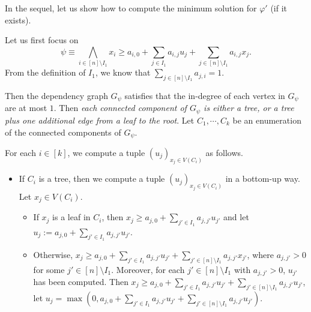 \documentclass[runningheads]{llncs}
\begin{document}
{In the sequel, let us show how to compute the minimum solution for $\varphi'$ (if it exists).

Let us first focus on 
\[
\psi  \equiv \bigwedge \limits_{i \in [n] \setminus I_1} x_i \ge a_{i,0} + \sum \limits_{j \in I_1} a_{i, j} u_j + \sum \limits_{j \in [n] \setminus I_1} a_{i, j} x_j.
\]
From the definition of $I_1$, we know that $\sum \limits_{j \in [n] \setminus I_1} a_{j, i} = 1$.  

Then the dependency graph $G_\psi$ satisfies that the in-degree of each vertex in $G_\psi$ are at most $1$. Then \emph{each connected component of $G_\psi$ is either a tree, or a tree plus one additional edge from a leaf to the root}. Let $C_1, \cdots, C_k$ be an enumeration of the connected components of $G_\psi$. 

For each $i \in [k]$, we compute a tuple $(u_j)_{x_j \in V(C_i)}$ as follows.  

\begin{itemize}
\item If $C_i$ is a tree, then we compute a tuple $(u_j)_{x_j \in V(C_i)}$ in a bottom-up way. Let $x_j \in V(C_i)$.  
\begin{itemize}
\item If $x_j$ is a leaf in $C_i$, then $x_j \ge a_{j,0} + \sum \limits_{j' \in I_1} a_{j, j'} u_{j'}$ and let $u_j := a_{j,0} + \sum \limits_{j' \in I_1} a_{j, j'} u_{j'}$.
%
\item Otherwise, $x_j \ge a_{j, 0} + \sum \limits_{j' \in I_1} a_{j, j'} u_{j'} + \sum \limits_{j' \in [n] \setminus I_1} a_{j, j'} x_{j'}$, where  $a_{j,j'} > 0$ for some $j' \in [n] \setminus I_1$. Moreover, for each $j' \in [n] \setminus I_1$ with $a_{j, j'} > 0$, $u_{j'}$ has been computed. Then  $x_j \ge a_{j, 0} + \sum \limits_{j' \in I_1} a_{j, j'} u_{j'} + \sum \limits_{j' \in [n] \setminus I_1} a_{j, j'} u_{j'}$, let $u_j = \max(0, a_{j, 0} + \sum \limits_{j' \in I_1} a_{j, j'} u_{j'} + \sum \limits_{j' \in [n] \setminus I_1} a_{j, j'} u_{j'})$.
\end{itemize}


\end{itemize}}
\end{document}
